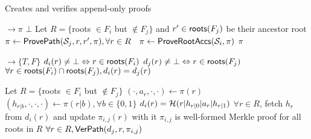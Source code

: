 \begin{algorithm}[H]%
    \caption{\small Creates and verifies append-only proofs}
    \label{a:aas:proveappendonly}
    \label{a:aas:verappendonly}
    \begin{algorithmic}[1]
     $\rightarrow \pi$
            \Return $\bot$
        \EndIf
        \State Let $R=\{$roots $\in F_i$ but $\not\in F_j\}$ and $r'\in \mathsf{roots}(F_j)$ be their ancestor root
        \State $\pi\gets \mathsf{ProvePath}(\mathcal{S}_j, r,r',\pi), \forall r \in R\quad \pi\gets\mathsf{ProveRootAccs}(\mathcal{S}_i,\pi)$
        \State \Return $\pi$
    \EndFunction

     $\rightarrow \{T,F\}$
        \Assert $d_i(r) \ne \bot \Leftrightarrow r\in \mathsf{roots}(F_i)$ 
        \label{a:aas:verappendonly:check-digest-begin}
        \Assert $d_j(r) \ne \bot \Leftrightarrow r\in \mathsf{roots}(F_j)$ 
        \label{a:aas:verappendonly:check-digest-end}
        \Assert $\forall r \in \mathsf{roots}(F_i) \cap \mathsf{roots}(F_j), d_i(r)=d_j(r)$
        
        \State Let $R=\{$roots $\in F_i$ but $\not\in F_j\}$ 
         
            \label{a:aas:verappendonly:check-old-root-accs-begin}
            \State $(\cdot,a_{r},\cdot,\cdot)\gets \pi(r)$ \quad $({h}_{r|b},\cdot,\cdot,\cdot) \gets \pi(r|b),\forall b\in \{0,1\}$
            \Assert $d_i(r) = \mathcal{H}(r|h_{r|0}|a_r|h_{r|1})$
        \EndFor
        \label{a:aas:verappendonly:check-old-root-accs-end}
        \State $\forall r\in R$, fetch $h_r$ from $d_i(r)$ and update $\pi_{i,j}(r)$ with it
        \Assert $\pi_{i,j}$ is well-formed Merkle proof for all roots in $R$
        \label{a:aas:verappendonly:well-formed}
        \Assert $\forall r\in R,\mathsf{VerPath}(d_j, r, \pi_{i,j})$
        \label{a:aas:verappendonly:paths}
    \EndFunction
    \end{algorithmic}
\end{algorithm}

